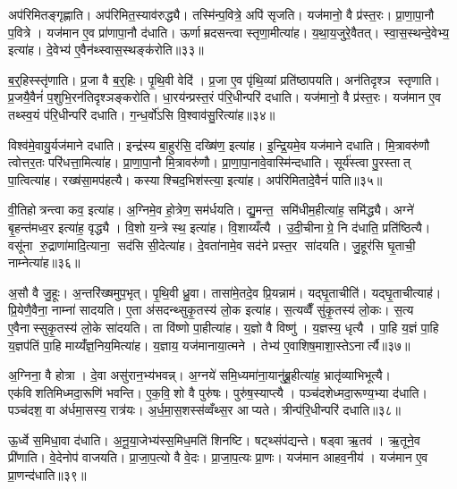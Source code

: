 अप॑रिमितङ्गृह्णाति। अप॑रिमित॒स्याव॑रुद्ध्यै। तस्मि॑न्प॒वित्रे॒ अपि॑ सृजति। यज॑मानो॒ वै प्र॑स्त॒रः। प्रा॒णा॒पा॒नौ प॒वित्रे। यज॑मान ए॒व प्रा॑णापा॒नौ द॑धाति। ऊर्णाम्रदसन्त्वा स्तृणा॒मीत्या॑ह। य॒था॒य॒जुरे॒वैतत्। स्वा॒स॒स्थन्दे॒वेभ्य॒ इत्या॑ह। दे॒वेभ्य॑ ए॒वैन॑थ्स्वास॒स्थङ्क॑रोति॥३३॥

ब॒र्॒हिस्स्तृ॑णाति। प्र॒जा वै ब॒र्॒हिः। पृ॒थि॒वी वेदि॑। प्र॒जा ए॒व पृ॑थि॒व्यां प्रति॑ष्ठापयति। अन॑तिदृश्ञ स्तृणाति। प्र॒जयै॒वैनं॑ प॒शुभि॒रन॑तिदृश्ञङ्करोति। धा॒रय॑न्प्रस्त॒रं प॑रि॒धीन्परि॑ दधाति। यज॑मानो॒ वै प्र॑स्त॒रः। यज॑मान ए॒व तथ्स्व॒यं प॑रि॒धीन्परि॑ दधाति। ग॒न्ध॒र्वो॑ऽसि वि॒श्वाव॑सु॒रित्या॑ह॥३४॥

विश्व॑मे॒वायु॒र्यज॑माने दधाति। इन्द्र॑स्य बा॒हुर॑सि॒ दख्षि॑ण॒ इत्या॑ह। इ॒न्द्रि॒यमे॒व यज॑माने दधाति। मि॒त्रावरु॑णौ त्वोत्तर॒तः परि॑धत्ता॒मित्या॑ह। प्रा॒णा॒पा॒नौ मि॒त्रावरु॑णौ। प्रा॒णा॒पा॒नावे॒वास्मि॑न्दधाति। सूर्य॑स्त्वा पु॒रस्तात् पा॒त्वित्या॑ह। रख्ष॑सा॒मप॑हत्यै। कस्याश्चिद॒भिश॑स्त्या॒ इत्या॑ह। अप॑रिमितादे॒वैनं॑ पाति॥३५॥

वी॒तिहोत्रन्त्वा कव॒ इत्या॑ह। अ॒ग्निमे॒व हो॒त्रेण॒ सम॑र्धयति। द्यु॒मन्त॒ समि॑धीम॒हीत्या॑ह॒ समि॑द्ध्यै। अग्ने॑ बृ॒हन्त॑मध्व॒र इत्या॑ह॒ वृद्ध्यै। वि॒शो य॒न्त्रे स्थ॒ इत्या॑ह। वि॒शाय्यँत्यै। उ॒दी॒चीनाग्रे॒ नि द॑धाति॒ प्रति॑ष्ठित्यै। वसू॑ना रु॒द्राणा॑मादि॒त्याना॒ सद॑सि सी॒देत्या॑ह। दे॒वता॑नामे॒व सद॑ने प्रस्त॒र सा॑दयति। जु॒हूर॑सि घृ॒ताची॒ नाम्नेत्या॑ह॥३६॥

अ॒सौ वै जु॒हूः। अ॒न्तरि॑ख्षमुप॒भृत्। पृ॒थि॒वी ध्रु॒वा। तासा॑मे॒तदे॒व प्रि॒यन्नाम॑। यद्घृ॒ताचीति॑। यद्घृ॒ताचीत्याह॑। प्रि॒येणै॒वैना॒ नाम्ना॑ सादयति। ए॒ता अ॑सदन्थ्सुकृ॒तस्य॑ लो॒क इत्या॑ह। स॒त्यव्वैँ सु॑कृ॒तस्य॑ लो॒कः। स॒त्य ए॒वैनास्सुकृ॒तस्य॑ लो॒के सा॑दयति। ता वि॑ष्णो पा॒हीत्या॑ह। य॒ज्ञो वै विष्णु॑। य॒ज्ञस्य॒ धृत्यै। पा॒हि य॒ज्ञं पा॒हि य॒ज्ञप॑तिं पा॒हि माय्यँ॑ज्ञ॒निय॒मित्या॑ह। य॒ज्ञाय॒ यज॑मानाया॒त्मने। तेभ्य॑ ए॒वाशिष॒माशा॒स्तेऽनार्त्यै॥३७॥\anuvakamend[स्थेत्या॑ह पृथि॒वी वेदि॒र्यन्ति॑ क्रि॒यते॒ वीणु॑र्वी॒र्य॑संमितङ्करोत्याह पाति॒ नाम्नेत्या॑ह लो॒के सा॑दयति॒ षट् च॑]

अ॒ग्निना॒ वै होत्रा। दे॒वा असु॑रान॒भ्य॑भवन्न्। अ॒ग्नये॑ समि॒ध्यमा॑ना॒यानु॑ब्रू॒हीत्या॑ह॒ भ्रातृ॑व्याभिभूत्यै। एक॑विशतिमिध्मदा॒रूणि॑ भवन्ति। ए॒क॒वि॒शो वै पुरु॑षः। पुरु॑ष॒स्याप्त्यै। पञ्च॑दशेध्मदा॒रूण्य॒भ्या द॑धाति। पञ्च॑दश॒ वा अ॑र्धमा॒सस्य॒ रात्र॑यः। अ॒र्ध॒मा॒स॒शस्स॑व्वँथ्स॒र आप्यते। त्रीन्प॑रि॒धीन्परि॑ दधाति॥३८॥

ऊ॒र्ध्वे स॒मिधा॒वा द॑धाति। अ॒नू॒या॒जेभ्य॑स्स॒मिध॒मति॑ शिनष्टि। षट्थ्संप॑द्यन्ते। षड्वा ऋ॒तव॑। ऋ॒तूने॒व प्री॑णाति। वे॒देनोप॑ वाजयति। प्रा॒जा॒प॒त्यो वै वे॒दः। प्रा॒जा॒प॒त्यः प्रा॒णः। यज॑मान आहव॒नीय॑। यज॑मान ए॒व प्रा॒णन्द॑धाति॥३९॥

